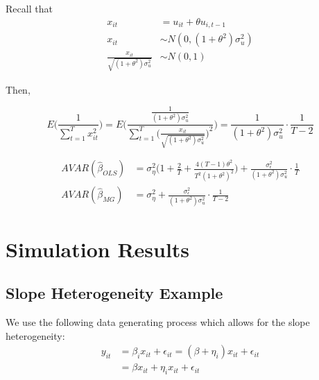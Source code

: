 Recall that 
\begin{align*}
x_{it} & = u_{it} + \theta u_{i,t-1}\\
x_{it} & \sim N(0, (1+\theta^2)\sigma_u^2)\\
\frac{x_{it}}{\sqrt{(1+\theta^2) \sigma_u^2}} & \sim N(0,1)
\end{align*}

Then, 

\[
E\bigg( \frac{1}{\sum_{t=1}^T x_{it}^2 } \bigg) = E \bigg( \frac{\frac{1}{(1+\theta^2)\sigma_u^2}}{\sum_{t=1}^T \big( \frac{x_{it}}{\sqrt{(1+\theta^2)\sigma_u^2}}\big)^2}   \bigg) = \frac{1}{(1+\theta^2)\sigma_u^2} \cdot \frac{1}{T-2}
\]


\begin{align*}
AVAR(\widehat{\beta}_{OLS}) &= \sigma_\eta^2 \bigg( 1+\frac{2}{T} +\frac{4(T-1)\theta^2}{T^2(1+\theta^2)^2}   \bigg)  + \frac{\sigma_\epsilon^2}{(1+\theta^2)\sigma_u^2} \cdot \frac{1}{T}\\
AVAR(\widehat{\beta}_{MG})& =\sigma_\eta^2 + \frac{\sigma_\epsilon^2}{(1+\theta^2)\sigma_u^2} \cdot \frac{1}{T-2} 
\end{align*}


\section{Simulation Results}
\subsection{Slope Heterogeneity Example}

We use the following data generating process which allows for the slope heterogeneity:
\begin{align*}
y_{it} & = \beta_i x_{it} + \epsilon_{it} = (\beta + \eta_i) x_{it} + \epsilon_{it}\\
&= \beta x_{it} + \eta_i x_{it} + \epsilon_{it}
\end{align*}

